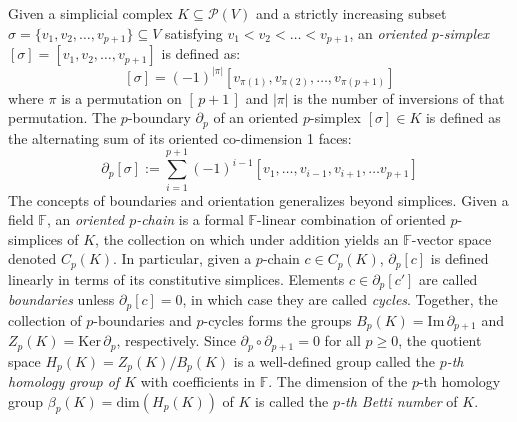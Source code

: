 \\
\\
Given a simplicial complex $K \subseteq \mathcal{P}(V)$ and a strictly increasing subset $\sigma = \{v_1, v_2, \dots, v_{p+1}\} \subseteq V$ satisfying $v_1 < v_2 < \dots < v_{p+1}$, an \emph{oriented $p$-simplex} $[\sigma] = [v_1, v_2, \dots, v_{p+1}]$ is defined as: 
\begin{equation}\label{eq:oriented_simplex}
	[\sigma] = (-1)^{\lvert \pi \rvert } \left [v_{\pi(1)}, v_{\pi(2)}, \dots, v_{\pi(p+1)} \right ]
\end{equation}
where $\pi$ is a permutation on $[\,p+1\,]$ and $\lvert \pi \rvert$ is the number of inversions of that permutation. The $p$-boundary $\partial_p$ of an oriented $p$-simplex $[\sigma] \in K$ is defined as the alternating sum of its oriented co-dimension 1 faces:
\begin{equation}\label{eq:alt_sum}
	\partial_p[\sigma] := \sum_{i=1}^{p+1} (-1)^{i-1} [v_1, \dots, v_{i-1}, v_{i+1}, \dots v_{p+1}]
\end{equation}
The concepts of boundaries and orientation generalizes beyond simplices. Given a field $\mathbb{F}$, an \emph{oriented $p$-chain} is a formal $\mathbb{F}$-linear combination of oriented $p$-simplices of $K$, the collection on which under addition yields an $\mathbb{F}$-vector space denoted $C_p(K)$.
In particular, given a $p$-chain $c \in C_p(K)$, $\partial_p[c]$ is defined linearly in terms of its constitutive simplices. Elements $c \in \partial_p[c']$ are called \emph{boundaries} unless $\partial_p[c] = 0$, in which case they are called \emph{cycles}.
 Together, the collection of $p$-boundaries and $p$-cycles forms the groups $B_p(K) = \mathrm{Im}\,\partial_{p+1}$ and $Z_p(K) = \mathrm{Ker}\,\partial_p$, respectively. Since $\partial_p \circ \partial_{p+1} = 0$ for all $p\geq 0$, the quotient space $H_p(K) = Z_p(K) / B_{p}(K)$ is a well-defined group called the \emph{$p$-th homology group of $K$} with coefficients in $\mathbb{F}$. The dimension of the $p$-th homology group $\beta_p(K) = \mathrm{dim}(H_p(K))$ of $K$ is called the \emph{$p$-th Betti number} of $K$. 

